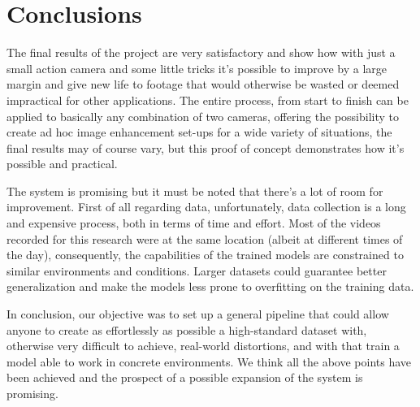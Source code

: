 \newpage
\chapter{Conclusions}
\label{cha:conclusions}

The final results of the project are very satisfactory and show how with just a small action camera and some little tricks it's possible to improve by a large margin and give new life to footage that would otherwise be wasted or deemed impractical for other applications. The entire process, from start to finish can be applied to basically any combination of two cameras, offering the possibility to create ad hoc image enhancement set-ups for a wide variety of situations, the final results may of course vary, but this proof of concept demonstrates how it's possible and practical.

The system is promising but it must be noted that there's a lot of room for improvement. First of all regarding data, unfortunately, data collection is a long and expensive process, both in terms of time and effort. Most of the videos recorded for this research were at the same location (albeit at different times of the day), consequently, the capabilities of the trained models are constrained to similar environments and conditions. Larger datasets could guarantee better generalization and make the models less prone to overfitting on the training data.

In conclusion, our objective was to set up a general pipeline that could allow anyone to create as effortlessly as possible a high-standard dataset with, otherwise very difficult to achieve, real-world distortions, and with that train a model able to work in concrete environments. We think all the above points have been achieved and the prospect of a possible expansion of the system is promising.

